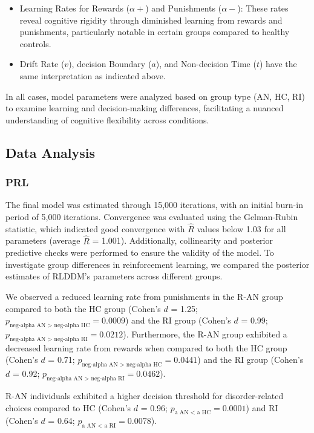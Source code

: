 \documentclass[
  man]{apa6}
\begin{document}
\begin{itemize}
\item
  Learning Rates for Rewards (\(\alpha+\)) and Punishments (\(\alpha-\)): These rates reveal cognitive rigidity through diminished learning from rewards and punishments, particularly notable in certain groups compared to healthy controls.
\item
  Drift Rate (\(v\)), decision Boundary (\(a\)), and Non-decision Time (\(t\)) have the same interpretation as indicated above.
\end{itemize}

In all cases, model parameters were analyzed based on group type (AN, HC, RI) to examine learning and decision-making differences, facilitating a nuanced understanding of cognitive flexibility across conditions.

\subsection{Data Analysis}\label{data-analysis}

\subsubsection{PRL}\label{prl-1}

The final model was estimated through 15,000 iterations, with an initial burn-in period of 5,000 iterations. Convergence was evaluated using the Gelman-Rubin statistic, which indicated good convergence with \(\hat{R}\) values below 1.03 for all parameters (average \(\hat{R}\) = 1.001). Additionally, collinearity and posterior predictive checks were performed to ensure the validity of the model. To investigate group differences in reinforcement learning, we compared the posterior estimates of RLDDM's parameters across different groups.

We observed a reduced learning rate from punishments in the R-AN group compared to both the HC group (Cohen's \(d\) = 1.25; \(p_{\text{neg-alpha AN > neg-alpha HC}} = 0.0009\)) and the RI group (Cohen's \(d\) = 0.99; \(p_{\text{neg-alpha AN > neg-alpha RI}} = 0.0212\)). Furthermore, the R-AN group exhibited a decreased learning rate from rewards when compared to both the HC group (Cohen's \(d\) = 0.71; \(p_{\text{neg-alpha AN > neg-alpha HC}} = 0.0441\)) and the RI group (Cohen's \(d\) = 0.92; \(p_{\text{neg-alpha AN > neg-alpha RI}} = 0.0462\)).

R-AN individuals exhibited a higher decision threshold for disorder-related choices
compared to HC (Cohen's \(d\) = 0.96; \(p_{\text{a AN < a HC}} = 0.0001\)) and RI (Cohen's \(d\) = 0.64; \(p_{\text{a AN < a RI}} = 0.0078\)).
\end{document}
